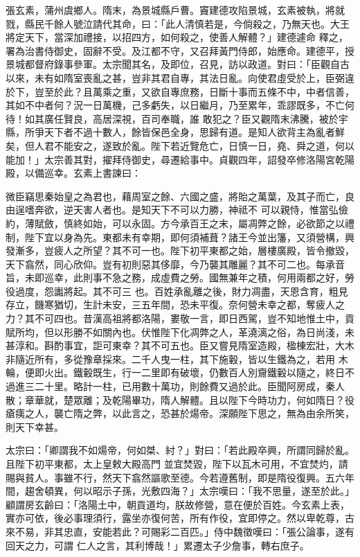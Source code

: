\begin{pinyinscope}
 張玄素，蒲州虞鄉人。隋末，為景城縣戶曹。竇建德攻陷景城，玄素被執，將就戮，縣民千餘人號泣請代其命，曰：「此人清慎若是，今倘殺之，乃無天也。大王將定天下，當深加禮接，以招四方，如何殺之，使善人解體？」建德遽命
 釋之，署為治書侍御史，固辭不受。及江都不守，又召拜黃門侍郎，始應命。建德平，授景城都督府錄事參軍。太宗聞其名，及即位，召見，訪以政道。對曰：「臣觀自古以來，未有如隋室喪亂之甚，豈非其君自專，其法日亂。向使君虛受於上，臣弼違於下，豈至於此？且萬乘之重，又欲自專庶務，日斷十事而五條不中，中者信善，其如不中者何？況一日萬機，己多虧失，以日繼月，乃至累年，乖謬既多，不亡何待！如其廣任賢良，高居深視，百司奉職，誰
 敢犯之？臣又觀隋末沸騰，被於宇縣，所爭天下者不過十數人，餘皆保邑全身，思歸有道。是知人欲背主為亂者鮮矣，但人君不能安之，遂致於亂。陛下若近覽危亡，日慎一日，堯、舜之道，何以能加！」太宗善其對，擢拜侍御史，尋遷給事中。貞觀四年，詔發卒修洛陽宮乾陽殿，以備巡幸。玄素上書諫曰：



 微臣竊思秦始皇之為君也，藉周室之餘、六國之盛，將貽之萬葉，及其子而亡，良由逞嗜奔欲，逆天害人者也。是知天下不可以力勝，神祗不
 可以親恃，惟當弘儉約，薄賦斂，慎終如始，可以永固。方今承百王之末，屬凋弊之餘，必欲節之以禮制，陛下宜以身為先。東都未有幸期，即何須補葺？諸王今並出籓，又須營構，興發漸多，豈疲人之所望？其不可一也。陛下初平東都之始，層樓廣殿，皆令撤毀，天下翕然，同心欣仰。豈有初則惡其侈靡，今乃襲其雕麗？其不可二也。每承音旨，未即巡幸，此則事不急之務，成虛費之勞。國無兼年之積，何用兩都之好，勞役過度，怨讟將起。其不可三
 也。百姓承亂離之後，財力凋盡，天恩含育，粗見存立，饑寒猶切，生計未安，三五年間，恐未平復。奈何營未幸之都，奪疲人之力？其不可四也。昔漢高祖將都洛陽，婁敬一言，即日西駕，豈不知地惟土中，貢賦所均，但以形勝不如關內也。伏惟陛下化凋弊之人，革澆漓之俗，為日尚淺，未甚淳和。斟酌事宜，詎可東幸？其不可五也。臣又嘗見隋室造殿，楹棟宏壯，大木非隨近所有，多從豫章採來。二千人曳一柱，其下施轂，皆以生鐵為之，若用
 木輪，便即火出。鐵轂既生，行一二里即有破壞，仍數百人別齎鐵轂以隨之，終日不過進三二十里。略計一柱，已用數十萬功，則餘費又過於此。臣聞阿房成，秦人散；章華就，楚眾離；及乾陽畢功，隋人解體。且以陛下今時功力，何如隋日？役瘡痍之人，襲亡隋之弊，以此言之，恐甚於煬帝。深願陛下思之，無為由余所笑，則天下幸甚。



 太宗曰：「卿謂我不如煬帝，何如桀、紂？」對曰：「若此殿卒興，所謂同歸於亂。且陛下初平東都，太上皇敕大殿高門
 並宜焚毀，陛下以瓦木可用，不宜焚灼，請賜與貧人。事雖不行，然天下翕然謳歌至德。今若遵舊制，即是隋役復興。五六年間，趨舍頓異，何以昭示子孫，光敷四海？」太宗嘆曰：「我不思量，遂至於此。」顧謂房玄齡曰：「洛陽土中，朝貢道均，朕故修營，意在便於百姓。今玄素上表，實亦可依，後必事理須行，露坐亦復何苦，所有作役，宜即停之。然以卑乾尊，古來不易，非其忠直，安能若此？可賜彩二百匹。」侍中魏徵嘆曰：「張公論事，遂有回天之力，可謂
 仁人之言，其利博哉！」累遷太子少詹事，轉右庶子。




\end{pinyinscope}
